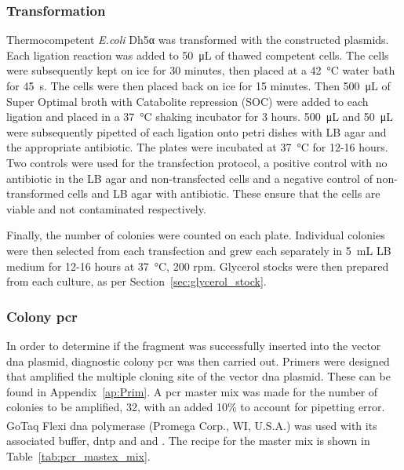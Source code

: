 \subsubsection{Transformation}
\label{sec:transfection}
Thermocompetent \textit{E.coli} Dh5α was transformed with the constructed plasmids. Each ligation reaction was added to \SI{50}{\micro\liter} of thawed competent cells. The cells were subsequently kept on ice for 30 minutes, then placed at a \SI{42}{\celsius} water bath for \SI{45}{\second}. The cells were then placed back on ice for 15 minutes. Then \SI{500}{\micro\liter} of Super Optimal broth with Catabolite repression (SOC) were added to each ligation and placed in a \SI{37}{\celsius} shaking incubator for 3 hours. \SI{500}{\micro\liter} and \SI{50}{\micro\liter} were subsequently pipetted of each ligation onto petri dishes with LB agar and the appropriate antibiotic. The plates were incubated at \SI{37}{\celsius} for 12-16 hours. Two controls were used for the transfection protocol, a positive control with no antibiotic in the LB agar and non-transfected cells and a negative control of non-transformed cells and LB agar with antibiotic. These ensure that the cells are viable and not contaminated respectively. 

Finally, the number of colonies were counted on each plate. Individual colonies were then selected from each transfection and grew each separately in \SI{5}{\milli\liter} LB medium for 12-16 hours at \SI{37}{\celsius}, 200 rpm. Glycerol stocks were then prepared from each culture, as per Section~\ref{sec:glycerol_stock}.



\subsubsection{Colony \acrshort{pcr}}

In order to determine if the fragment was successfully inserted into the vector \acrshort{dna} plasmid, diagnostic colony \acrshort{pcr} was then carried out. Primers were designed that amplified the multiple cloning site of the vector \acrshort{dna} plasmid. These can be found in Appendix~\ref{ap:Prim}. A \acrshort{pcr} master mix was made for the number of colonies to be amplified, 32, with an added 10\% to account for pipetting error. GoTaq\textsuperscript{\textregistered} Flexi \acrshort{dna} polymerase (Promega Corp., WI, U.S.A.) was used with its associated buffer, \acrshort{dntp} and and . The recipe for the master mix is shown in Table~\ref{tab:pcr_mastex_mix}.

